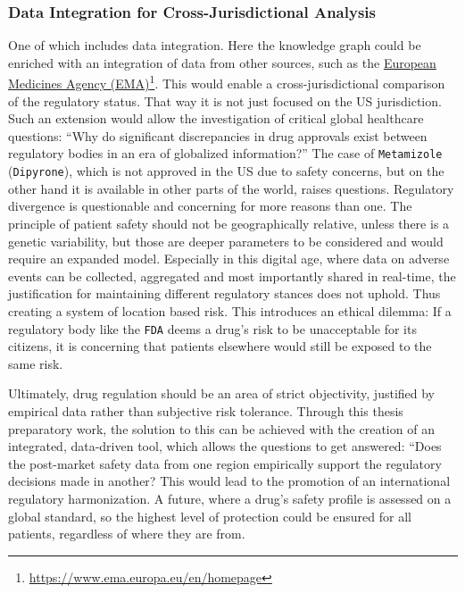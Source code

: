 \subsubsection*{Data Integration for Cross-Jurisdictional Analysis}
One of which includes data integration. Here the knowledge graph could be enriched with an integration of data from other sources, such as the \href{https://www.ema.europa.eu/en/homepage}{European Medicines Agency (EMA)}\footnote{\url{https://www.ema.europa.eu/en/homepage}}. This would enable a cross-jurisdictional comparison of the regulatory status. That way it is not just focused on the US jurisdiction. Such an extension would allow the investigation of critical global healthcare questions: “Why do significant discrepancies in drug approvals exist between regulatory bodies in an era of globalized information?” The case of \texttt{Metamizole} (\texttt{Dipyrone}), which is not approved in the US due to safety concerns, but on the other hand it is available in other parts of the world, raises questions. Regulatory divergence is questionable and concerning for more reasons than one. The principle of patient safety should not be geographically relative, unless there is a genetic variability, but those are deeper parameters to be considered and would require an expanded model. Especially in this digital age, where data on adverse events can be collected, aggregated and most importantly shared in real-time, the justification for maintaining different regulatory stances does not uphold. Thus creating a system of location based risk. This introduces an ethical dilemma: If a regulatory body like the \texttt{FDA} deems a drug's risk to be unacceptable for its citizens, it is concerning that patients elsewhere would still be exposed to the same risk.

Ultimately, drug regulation should be an area of strict objectivity, justified by empirical data rather than subjective risk tolerance. Through this thesis preparatory work, the solution to this can be achieved with the creation of an integrated, data-driven tool, which allows the questions to get answered: “Does the post-market safety data from one region empirically support the regulatory decisions made in another? This would lead to the promotion of an international regulatory harmonization. A future, where a drug's safety profile is assessed on a global standard, so the highest level of protection could be ensured for all patients, regardless of where they are from.

